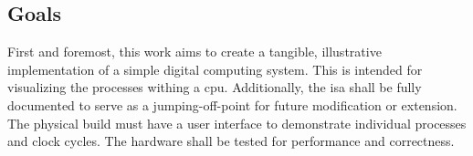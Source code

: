 \subsection{Goals}

First and foremost, this work aims to create a tangible, illustrative implementation of a simple digital computing system. This is intended for visualizing the processes withing a \ac{cpu}. Additionally, the \ac{isa} shall be fully documented to serve as a jumping-off-point for future modification or extension. The physical build must have a user interface to demonstrate individual processes and clock cycles. The hardware shall be tested for performance and correctness.